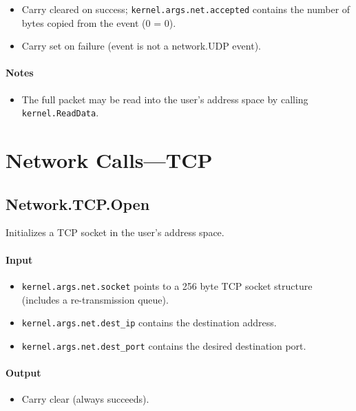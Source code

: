 \begin{itemize}
\item Carry cleared on success; \verb+kernel.args.net.accepted+ contains the number of bytes copied from the event (0 = 0).
\item Carry set on failure (event is not a network.UDP event).
\end{itemize}

\paragraph{Notes}

\begin{itemize}
\item The full packet may be read into the user's address space by calling \verb+kernel.ReadData+.
\end{itemize}

\section*{Network Calls---TCP}

\subsection*{Network.TCP.Open}
Initializes a TCP socket in the user's address space.

\paragraph{Input}

\begin{itemize}
\item \verb+kernel.args.net.socket+ points to a 256 byte TCP socket structure (includes a re-transmission queue).
\item \verb+kernel.args.net.dest_ip+ contains the destination address.
\item \verb+kernel.args.net.dest_port+ contains the desired destination port.
\end{itemize}

\paragraph{Output}

\begin{itemize}
\item Carry clear (always succeeds).
\end{itemize}

